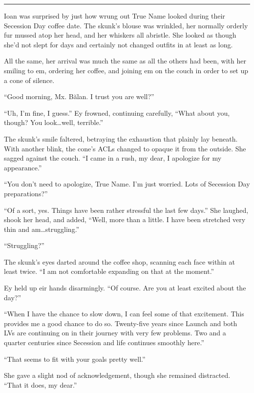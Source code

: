 \begin{center}\rule{0.5\linewidth}{0.5pt}\end{center}

Ioan was surprised by just how wrung out True Name looked during their Secession Day coffee date. The skunk's blouse was wrinkled, her normally orderly fur mussed atop her head, and her whiskers all abristle. She looked as though she'd not slept for days and certainly not changed outfits in at least as long.

All the same, her arrival was much the same as all the others had been, with her smiling to em, ordering her coffee, and joining em on the couch in order to set up a cone of silence.

``Good morning, Mx. Bălan. I trust you are well?''

``Uh, I'm fine, I guess.'' Ey frowned, continuing carefully, ``What about you, though? You look\ldots well, terrible.''

The skunk's smile faltered, betraying the exhaustion that plainly lay beneath. With another blink, the cone's ACLs changed to opaque it from the outside. She sagged against the couch. ``I came in a rush, my dear, I apologize for my appearance.''

``You don't need to apologize, True Name. I'm just worried. Lots of Secession Day preparations?''

``Of a sort, yes. Things have been rather stressful the last few days.'' She laughed, shook her head, and added, ``Well, more than a little. I have been stretched very thin and am\ldots struggling.''

``Struggling?''

The skunk's eyes darted around the coffee shop, scanning each face within at least twice. ``I am not comfortable expanding on that at the moment.''

Ey held up eir hands disarmingly. ``Of course. Are you at least excited about the day?''

``When I have the chance to slow down, I can feel some of that excitement. This provides me a good chance to do so. Twenty-five years since Launch and both LVs are continuing on in their journey with very few problems. Two and a quarter centuries since Secession and life continues smoothly here.''

``That seems to fit with your goals pretty well.''

She gave a slight nod of acknowledgement, though she remained distracted. ``That it does, my dear.''

